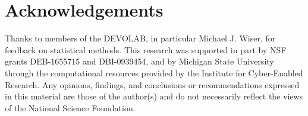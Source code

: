 \section{Acknowledgements}

Thanks to members of the DEVOLAB, in particular Michael J. Wiser, for feedback on statistical methods.  This research was supported in part by NSF grants DEB-1655715 and DBI-0939454, and by Michigan State University through the computational resources provided by the Institute for Cyber-Enabled Research. Any opinions, findings, and conclusions or recommendations expressed in this material are those of the author(s) and do not necessarily reflect the views of the National Science Foundation.
